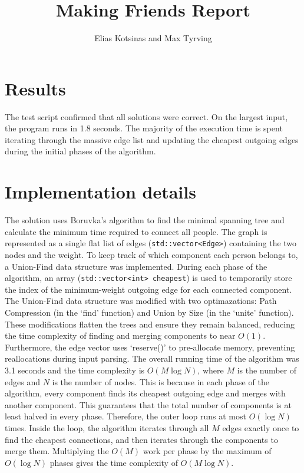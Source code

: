 \documentclass{article}
\title{Making Friends Report}
\author{Elias Kotsinas and Max Tyrving}
\begin{document}
  \maketitle

  \section{Results}

  
  The test script confirmed that all solutions were correct. On the largest input, the program runs in 1.8 seconds. The majority of the execution time is spent iterating through the massive edge list and updating the cheapest outgoing edges during the initial phases of the algorithm.

  \section{Implementation details}


  The solution uses Boruvka's algorithm to find the minimal spanning tree and calculate the minimum time required to connect all people. The graph is represented as a single flat list of edges (\texttt{std::vector<Edge>}) containing the two nodes and the weight.
  To keep track of which component each person belongs to, a Union-Find data structure was implemented. During each phase of the algorithm, an array (\texttt{std::vector<int> cheapest}) is used to temporarily store the index of the minimum-weight outgoing edge for each connected component.
  The Union-Find data structure was modified with two optimazations: Path Compression (in the `find' function) and Union by Size (in the `unite' function). These modifications flatten the trees and ensure they remain balanced, reducing the time complexity of finding and merging components
  to near $O(1)$. Furthermore, the edge vector uses `reserve()' to pre-allocate memory, preventing reallocations during input parsing. The overall running time of the algorithm was 3.1 seconds and the time complexity is $O(M \log N)$, where $M$ is the number of edges and $N$ is the number of nodes.
  This is because in each phase of the algorithm, every component finds its cheapest outgoing edge and merges with another component. This guarantees that the total number of components is at least halved in every phase. Therefore, the outer loop runs at most $O(\log N)$ times. Inside the loop, the 
  algorithm iterates through all $M$ edges exactly once to find the cheapest connections, and then iterates through the components to merge them. Multiplying the $O(M)$ work per phase by the maximum of $O(\log N)$ phases gives the time complexity of $O(M \log N)$.
\end{document}
